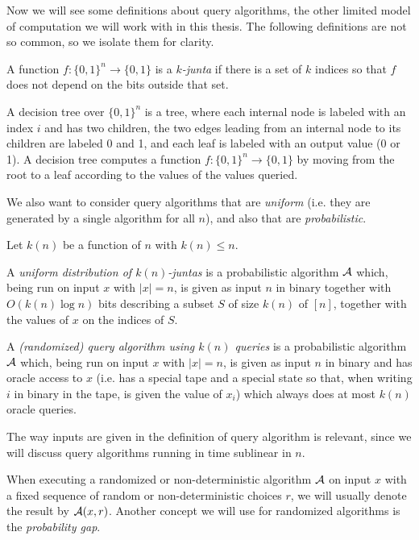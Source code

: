 Now we will see some definitions about query algorithms, the other limited 
model of computation we will work with in this thesis. 
The following definitions are not so common, so we isolate them for clarity.

\begin{definition}
	A function $f \colon \{0, 1\}^n \to \{0, 1\}$ is a \emph{$k$-junta} if there is a set of $k$ indices
	so that $f$ does not depend on the bits outside that set.

	A decision tree over $\{0, 1\}^n$ is a tree, where each internal node
is labeled with an index $i$ and has two children, the two edges leading from an internal node to its
children are labeled 0 and 1, and each leaf is labeled with an output value (0 or 1). A decision tree
computes a function $f \colon \{0, 1\}^n \to \{0, 1\}$ by moving from the root to a leaf according to the values of the
values queried.
\end{definition}

We also want to consider query algorithms that are \emph{uniform} (i.e. they are generated by 
a single algorithm for all $n$), and also that are \emph{probabilistic}.

\begin{definition}
	Let $k(n)$ be a function of $n$ with $k(n) \leq n$.

	A \emph{uniform distribution of $k(n)$-juntas} is a probabilistic algorithm $\mathcal{A}$ which, 
	being run on input $x$ with $|x| = n$, is given as input $n$ in binary together with 
	$O(k(n) \log n)$ bits describing a subset $S$ of size $k(n)$ of $[n]$, together with the values
	of $x$ on the indices of $S$.

	A \emph{(randomized) query algorithm using $k(n)$ queries} is a probabilistic algorithm $\mathcal{A}$
	which, being run on input $x$ with $|x| = n$, is given as input $n$ in binary and has oracle access
	to $x$ (i.e. has a special tape and a special state so that, when writing $i$ in binary in the tape,
	is given the value of $x_i$) which always does at most $k(n)$ oracle queries.
\end{definition}

The way inputs are given in the definition of query algorithm is relevant, since we will 
discuss query algorithms running in time sublinear in $n$. 

When executing a randomized or non-deterministic algorithm $\mathcal{A}$ on input $x$
with a fixed sequence of 
random or non-deterministic choices $r$, we will usually denote the result by $\mathcal{A}(x, r)$.
Another concept we will use for randomized algorithms is the \emph{probability gap}.

